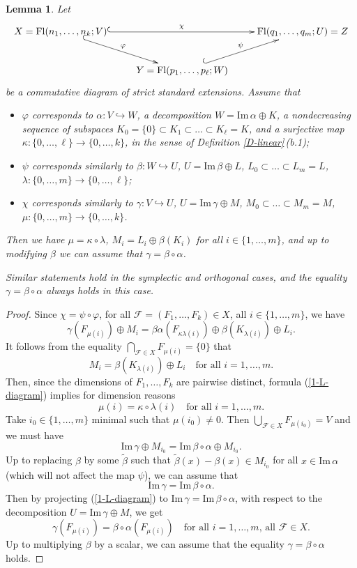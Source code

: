\documentclass[12pt]{amsart}
\newtheorem{lemma}[theorem]{Lemma}
\theoremstyle{definition}
\begin{document}
\begin{lemma}
\label{L-diagram}
Let 
\[\xymatrix{X=\mathrm{Fl}(n_1,\ldots,n_k;V) \ar@{^{(}->}[rr]^\chi \ar@{^{(}->}[rd]^\varphi & & \mathrm{Fl}(q_1,\ldots,q_m;U)=Z \\
 & Y=\mathrm{Fl}(p_1,\ldots,p_\ell;W) \ar@{^{(}->}[ru]^\psi}\]
be a commutative diagram of strict standard extensions.
Assume that 
\begin{itemize}
\item $\varphi$ corresponds to $\alpha:V\hookrightarrow W$, a decomposition $W=\mathrm{Im}\,\alpha\oplus K$, a nondecreasing sequence of subspaces $K_0=\{0\}\subset K_1\subset\ldots\subset K_\ell=K$, and a surjective map $\kappa:\{0,\ldots,\ell\}\to\{0,\ldots,k\}$, in the sense of Definition \ref{D-linear}\,(b.1);
\item $\psi$ corresponds similarly to $\beta:W\hookrightarrow U$, $U=\mathrm{Im}\,\beta\oplus L$, $L_0\subset\ldots\subset L_m=L$, $\lambda:\{0,\ldots,m\}\to\{0,\ldots,\ell\}$;
\item $\chi$ corresponds similarly to $\gamma:V\hookrightarrow U$, $U=\mathrm{Im}\,\gamma\oplus M$, $M_0\subset\ldots\subset M_m=M$, $\mu:\{0,\ldots,m\}\to\{0,\ldots,k\}$.
\end{itemize}
Then we have $\mu=\kappa\circ\lambda$, $M_i=L_i\oplus\beta(K_i)$ for all $i\in\{1,\ldots,m\}$, and up to modifying $\beta$ we can assume that $\gamma=\beta\circ\alpha$.

Similar statements hold in the symplectic and orthogonal cases, and the equality $\gamma=\beta\circ\alpha$ always holds in this case.
\end{lemma}

\begin{proof}
Since $\chi=\psi\circ\varphi$, for all $\mathcal{F}=(F_1,\ldots,F_k)\in X$, all $i\in\{1,\ldots,m\}$, we have
\begin{equation}
\label{1-L-diagram}
\gamma(F_{\mu(i)})\oplus M_i=\beta\alpha(F_{\kappa\lambda(i)})\oplus \beta(K_{\lambda(i)})\oplus L_i.
\end{equation}
It follows from the equality $\bigcap_{\mathcal{F}\in X}F_{\mu(i)}=\{0\}$ that
\[M_i=\beta(K_{\lambda(i)})\oplus L_i\quad\mbox{for all $i=1,\ldots,m$}.\]
Then, since the dimensions of $F_1,\ldots,F_k$ are pairwise distinct, formula (\ref{1-L-diagram}) implies for dimension reasons
\[\mu(i)=\kappa\circ\lambda(i)\quad\mbox{for all $i=1,\ldots,m$}.\]
Take $i_0\in\{1,\ldots,m\}$ minimal such that $\mu(i_0)\not=0$. Then $\bigcup_{\mathcal{F}\in X}F_{\mu(i_0)}=V$ and we must have
\[\mathrm{Im}\,\gamma\oplus M_{i_0}=\mathrm{Im}\,\beta\circ\alpha\oplus M_{i_0}.\]
Up to replacing $\beta$ by some $\tilde\beta$ such that $\tilde\beta(x)-\beta(x)\in M_{i_0}$ for all $x\in \mathrm{Im}\,\alpha$ (which will not affect the map $\psi$), we can assume that 
\[\mathrm{Im}\,\gamma=\mathrm{Im}\,\beta\circ\alpha.\]
Then by projecting (\ref{1-L-diagram}) to $\mathrm{Im}\,\gamma=\mathrm{Im}\,\beta\circ\alpha$,
with respect to the decomposition $U=\mathrm{Im}\,\gamma\oplus M$, we get
\[\gamma(F_{\mu(i)})=\beta\circ\alpha(F_{\mu(i)})\quad\mbox{for all $i=1,\ldots,m$,\ all $\mathcal{F}\in X$}.\]
Up to multiplying $\beta$ by a scalar, we can assume that the equality $\gamma=\beta\circ\alpha$ holds.
\end{proof}
\end{document}

